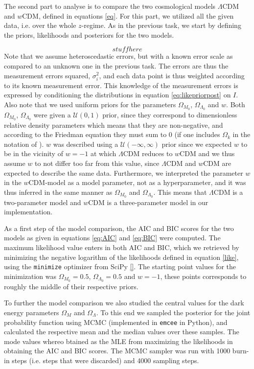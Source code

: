 \documentclass[11pt,a4paper]{article}
\begin{document}
The second part to analyse is to compare the two cosmological models $\Lambda$CDM and $w$CDM, defined in equations \eqref{eq}. For this part, we utilized all the given data, i.e. over the whole $z$-regime. As in the previous task, we start by defining the priors, likelihoods and posteriors for the two models. 

\begin{equation}
    \label{eq:likepriorpost}
    stuff here
\end{equation}
Note that we assume heteroscedastic errors, but with a known error scale as compared to an unknown one in the previous task. The errors are thus the measurement errors squared, $\sigma_i^2$, and each data point is thus weighted according to its known measurement error. This knowledge of the measurement errors is expressed by conditioning the distributions in equation \eqref{eq:likepriorpost} on $I$. Also note that we used uniform priors for the parameters $\Omega_{M_0}$, $\Omega_{\Lambda_0}$ and $w$. Both $\Omega_{M_0}$, $\Omega_{\Lambda_0}$ were given a $\mathcal{U}(0,1)$ prior, since they correspond to dimensionless relative density parameters which means that they are non-negative, and according to the Friedman equation they must sum to 0 (if one includes $\Omega_k$ in the notation of \cite{project_pm}). $w$ was described using a $\mathcal{U}(-\infty,\infty)$ prior since we expected $w$ to be in the vicinity of $w=-1$ at which $\Lambda$CDM reduces to $w$CDM and we thus assume $w$ to not differ too far from this value, since $\Lambda$CDM and $w$CDM are expected to describe the same data.
Furthermore, we interpreted the parameter $w$ in the $w$CDM-model as a model parameter, not as a hyperparameter, and it was thus inferred in the same manner as $\Omega_{M_0}$ and $\Omega_{\Lambda_0}$. This means that $\Lambda$CDM is a two-parameter model and $w$CDM is a three-parameter model in our implementation.

As a first step of the model comparison, the AIC and BIC scores for the two models as given in equations \eqref{eq:AIC} and \eqref{eq:BIC} were computed. The maximum likelihood value enters in both AIC and BIC, which we retrieved by minimizing the negative logarithm of the likelihoods defined in equation \eqref{like}, using the \texttt{minimize} optimizer from SciPy \ref{}. The starting point values for the minimization was $\Omega_{M_0}=0.5$, $\Omega_{\Lambda_0}=0.5$ and $w=-1$, these points corresponds to roughly the middle of their respective priors. 

To further the model comparison we also studied the central values for the dark energy parameters $\Omega_M$ and $\Omega_\Lambda$. To this end we sampled the posterior for the joint probability function using MCMC (implemented in \texttt{emcee} in Python), and calculated the respective mean and the median values over these samples. The mode values whereo btained as the MLE from maximizing the likelihoods in obtaining the AIC and BIC scores. The MCMC sampler was run with 1000 burn-in steps (i.e. steps that were discarded) and 4000 sampling steps. 
\end{document}
